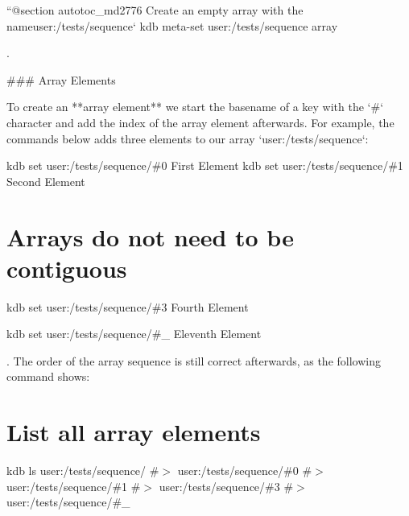 ``{\ttfamily  @section autotoc\+\_\+md2776 Create an empty array with the name}user\+:/tests/sequence` kdb meta-\/set user\+:/tests/sequence array \textquotesingle{}\textquotesingle{} 
\begin{DoxyCode}
.

### Array Elements

To create an **array element** we start the basename of a key with the `#` character and add the index of
       the array element afterwards. For example, the commands below adds three elements to our array
       `user:/tests/sequence`:
\end{DoxyCode}
 kdb set user\+:/tests/sequence/\#0 \textquotesingle{}First Element\textquotesingle{} kdb set user\+:/tests/sequence/\#1 \textquotesingle{}Second Element\textquotesingle{} \hypertarget{doc_tutorials_arrays_md_autotoc_md2777}{}\section{Arrays do not need to be contiguous}\label{doc_tutorials_arrays_md_autotoc_md2777}
kdb set user\+:/tests/sequence/\#3 \textquotesingle{}Fourth Element\textquotesingle{} 
 kdb set user\+:/tests/sequence/\#\+\_ \textquotesingle{}Eleventh Element\textquotesingle{} 
\begin{DoxyCode}
. The order of the array sequence is still correct afterwards, as the following command shows:
\end{DoxyCode}
 \hypertarget{doc_tutorials_arrays_md_autotoc_md2778}{}\section{List all array elements}\label{doc_tutorials_arrays_md_autotoc_md2778}
kdb ls user\+:/tests/sequence/ \#$>$ user\+:/tests/sequence/\#0 \#$>$ user\+:/tests/sequence/\#1 \#$>$ user\+:/tests/sequence/\#3 \#$>$ user\+:/tests/sequence/\#\+\_ 
